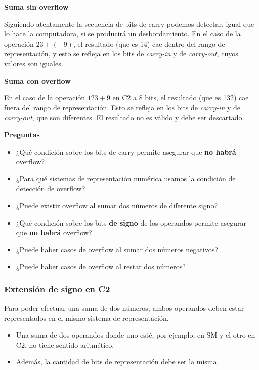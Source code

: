 \documentclass[spanish,a4paper,]{article}
\providecommand{\tightlist}{%
  \setlength{\itemsep}{0pt}\setlength{\parskip}{0pt}}
\begin{document}
\textbf{Suma sin overflow}

Siguiendo atentamente la secuencia de bits de carry podemos detectar,
igual que lo hace la computadora, si se producirá un desbordamiento. En
el caso de la operación \(23 + (-9)\), el resultado (que es 14) cae
dentro del rango de representación, y esto se refleja en los bits de
\emph{carry-in} y de \emph{carry-out}, cuyos valores son iguales.

\textbf{Suma con overflow}

En el caso de la operación \(123 + 9\) en C2 a 8 bits, el resultado (que
es 132) cae fuera del rango de representación. Esto se refleja en los
bits de \emph{carry-in} y de \emph{carry-out}, que son diferentes. El
resultado no es válido y debe ser descartado.

\textbf{Preguntas}

\begin{itemize}
\tightlist
\item
  ¿Qué condición sobre los bits de carry permite asegurar que \textbf{no
  habrá} overflow?
\item
  ¿Para qué sistemas de representación numérica usamos la condición de
  detección de overflow?
\item
  ¿Puede existir overflow al sumar dos números de diferente signo?
\item
  ¿Qué condición sobre los bits \textbf{de signo} de los operandos
  permite asegurar que \textbf{no habrá} overflow?
\item
  ¿Puede haber casos de overflow al sumar dos números negativos?
\item
  ¿Puede haber casos de overflow al restar dos números?
\end{itemize}

\hypertarget{extensiuxf3n-de-signo-en-c2}{%
\subsubsection{Extensión de signo en
C2}\label{extensiuxf3n-de-signo-en-c2}}

Para poder efectuar una suma de dos números, ambos operandos deben estar
representados en el mismo sistema de representación.

\begin{itemize}
\tightlist
\item
  Una suma de dos operandos donde uno esté, por ejemplo, en SM y el otro
  en C2, no tiene sentido aritmético.
\item
  Además, la cantidad de bits de representación debe ser la misma.
\end{itemize}
\end{document}
